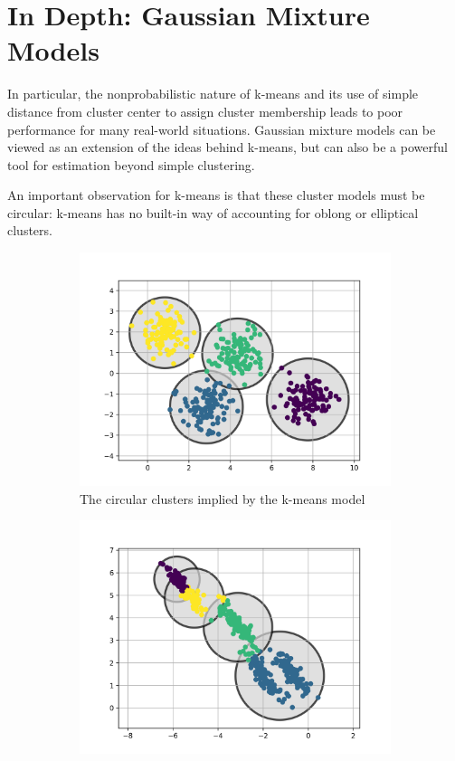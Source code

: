 \chapter{In Depth: Gaussian Mixture Models\label{Ch48}}
In particular, the nonprobabilistic nature of k-means and its use of simple
distance from cluster center to assign cluster membership leads to poor performance
for many real-world situations. Gaussian mixture models can be viewed as an extension of the ideas behind k-means, but can
also be a powerful tool for estimation beyond simple clustering.

An important observation for k-means is that these cluster models must be circular: k-means has no built-in way of accounting for oblong or elliptical clusters.

\begin{figure}
    \centering
    \begin{subfigure}[f]{.45\textwidth}
        \includegraphics[width=\textwidth]{../img/fig48-2.png}
        \caption{The circular clusters implied by the k-means model}
    \end{subfigure}
    \hfill
    \begin{subfigure}[f]{.45\textwidth}
        \includegraphics[width=\textwidth]{../img/fig48-3.png}

\end{subfigure}
\end{figure}
